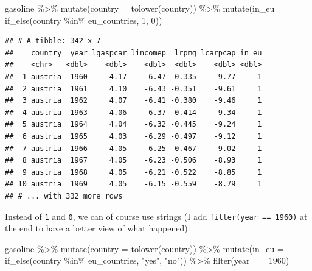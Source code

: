 \documentclass[
]{article}
\newenvironment{Shaded}{\begin{snugshade}}{\end{snugshade}}
\newcommand{\AttributeTok}[1]{\textcolor[rgb]{0.77,0.63,0.00}{#1}}
\newcommand{\DecValTok}[1]{\textcolor[rgb]{0.00,0.00,0.81}{#1}}
\newcommand{\FunctionTok}[1]{\textcolor[rgb]{0.00,0.00,0.00}{#1}}
\newcommand{\NormalTok}[1]{#1}
\newcommand{\SpecialCharTok}[1]{\textcolor[rgb]{0.00,0.00,0.00}{#1}}
\newcommand{\StringTok}[1]{\textcolor[rgb]{0.31,0.60,0.02}{#1}}
\begin{document}
\begin{Shaded}
\begin{Highlighting}[]
\NormalTok{gasoline }\SpecialCharTok{\%\textgreater{}\%}
  \FunctionTok{mutate}\NormalTok{(}\AttributeTok{country =} \FunctionTok{tolower}\NormalTok{(country)) }\SpecialCharTok{\%\textgreater{}\%}
  \FunctionTok{mutate}\NormalTok{(}\AttributeTok{in\_eu =} \FunctionTok{if\_else}\NormalTok{(country }\SpecialCharTok{\%in\%}\NormalTok{ eu\_countries, }\DecValTok{1}\NormalTok{, }\DecValTok{0}\NormalTok{))}
\end{Highlighting}
\end{Shaded}

\begin{verbatim}
## # A tibble: 342 x 7
##    country  year lgaspcar lincomep  lrpmg lcarpcap in_eu
##    <chr>   <dbl>    <dbl>    <dbl>  <dbl>    <dbl> <dbl>
##  1 austria  1960     4.17    -6.47 -0.335    -9.77     1
##  2 austria  1961     4.10    -6.43 -0.351    -9.61     1
##  3 austria  1962     4.07    -6.41 -0.380    -9.46     1
##  4 austria  1963     4.06    -6.37 -0.414    -9.34     1
##  5 austria  1964     4.04    -6.32 -0.445    -9.24     1
##  6 austria  1965     4.03    -6.29 -0.497    -9.12     1
##  7 austria  1966     4.05    -6.25 -0.467    -9.02     1
##  8 austria  1967     4.05    -6.23 -0.506    -8.93     1
##  9 austria  1968     4.05    -6.21 -0.522    -8.85     1
## 10 austria  1969     4.05    -6.15 -0.559    -8.79     1
## # ... with 332 more rows
\end{verbatim}

Instead of \texttt{1} and \texttt{0}, we can of course use strings (I add \texttt{filter(year\ ==\ 1960)} at the end to
have a better view of what happened):

\begin{Shaded}
\begin{Highlighting}[]
\NormalTok{gasoline }\SpecialCharTok{\%\textgreater{}\%}
  \FunctionTok{mutate}\NormalTok{(}\AttributeTok{country =} \FunctionTok{tolower}\NormalTok{(country)) }\SpecialCharTok{\%\textgreater{}\%}
  \FunctionTok{mutate}\NormalTok{(}\AttributeTok{in\_eu =} \FunctionTok{if\_else}\NormalTok{(country }\SpecialCharTok{\%in\%}\NormalTok{ eu\_countries, }\StringTok{"yes"}\NormalTok{, }\StringTok{"no"}\NormalTok{)) }\SpecialCharTok{\%\textgreater{}\%}
  \FunctionTok{filter}\NormalTok{(year }\SpecialCharTok{==} \DecValTok{1960}\NormalTok{)}
\end{Highlighting}
\end{Shaded}
\end{document}
